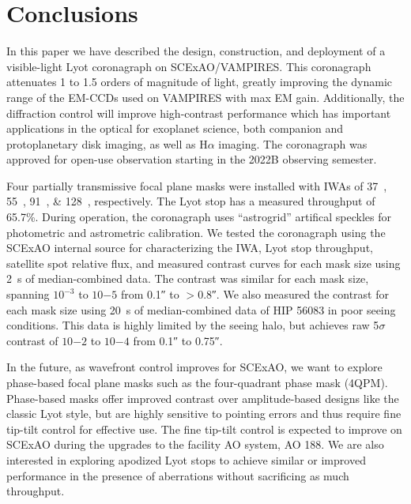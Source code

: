 \documentclass[]{spie}  %
\begin{document}
\section{Conclusions}\label{sec:conclusions}

In this paper we have described the design, construction, and deployment of a visible-light Lyot coronagraph on SCExAO/VAMPIRES. This coronagraph attenuates 1 to 1.5 orders of magnitude of light, greatly improving the dynamic range of the EM-CCDs used on VAMPIRES with max EM gain. Additionally, the diffraction control will improve high-contrast performance which has important applications in the optical for exoplanet science, both companion and protoplanetary disk imaging, as well as H$\alpha$ imaging. The coronagraph was approved for open-use observation starting in the 2022B observing semester.

Four partially transmissive focal plane masks were installed with IWAs of \qtylist{37;55;91;128}{\milliarcsecond}, respectively. The Lyot stop has a measured throughput of 65.7\%. During operation, the coronagraph uses ``astrogrid'' artifical speckles for photometric and astrometric calibration. We tested the coronagraph using the SCExAO internal source for characterizing the IWA, Lyot stop throughput, satellite spot relative flux, and measured contrast curves for each mask size using \qty{2}{\second} of median-combined data. The contrast was similar for each mask size, spanning $10^{-3}$ to $10{-5}$ from \ang{;;0.1} to $>$\ang{;;0.8}. We also measured the contrast for each mask size using \qty{20}{\second} of median-combined data of HIP 56083 in poor seeing conditions. This data is highly limited by the seeing halo, but achieves raw 5$\sigma$ contrast of $10{-2}$ to $10{-4}$ from \ang{;;0.1} to \ang{;;0.75}.

In the future, as wavefront control improves for SCExAO, we want to explore phase-based focal plane masks such as the four-quadrant phase mask (4QPM)\cite{rouanFourQuadrantPhase2007}. Phase-based masks offer improved contrast over amplitude-based designs like the classic Lyot style, but are highly sensitive to pointing errors and thus require fine tip-tilt control for effective use\cite{huby2017}. The fine tip-tilt control is expected to improve on SCExAO during the upgrades to the facility AO system, AO 188. We are also interested in exploring apodized Lyot stops to achieve similar or improved performance in the presence of aberrations without sacrificing as much throughput.

\end{document}
